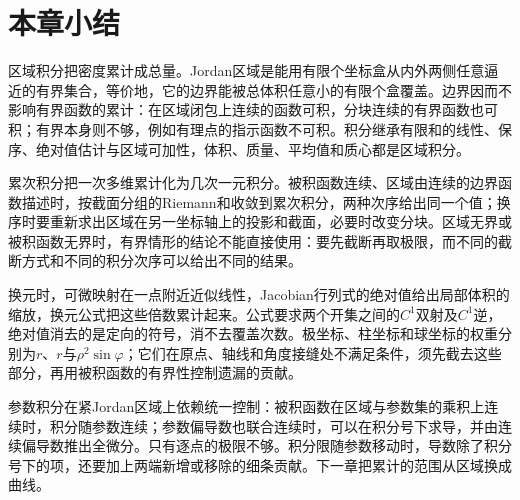 \FloatBarrier
\section{本章小结}
\label{sec:region-integrals-summary}

区域积分把密度累计成总量。Jordan区域是能用有限个坐标盒从内外两侧任意逼近的有界集合，等价地，它的边界能被总体积任意小的有限个盒覆盖。边界因而不影响有界函数的累计：在区域闭包上连续的函数可积，分块连续的有界函数也可积；有界本身则不够，例如有理点的指示函数不可积。积分继承有限和的线性、保序、绝对值估计与区域可加性，体积、质量、平均值和质心都是区域积分。

累次积分把一次多维累计化为几次一元积分。被积函数连续、区域由连续的边界函数描述时，按截面分组的Riemann和收敛到累次积分，两种次序给出同一个值；换序时要重新求出区域在另一坐标轴上的投影和截面，必要时改变分块。区域无界或被积函数无界时，有界情形的结论不能直接使用：要先截断再取极限，而不同的截断方式和不同的积分次序可以给出不同的结果。

换元时，可微映射在一点附近近似线性，Jacobian行列式的绝对值给出局部体积的缩放，换元公式把这些倍数累计起来。公式要求两个开集之间的$C^1$双射及$C^1$逆，绝对值消去的是定向的符号，消不去覆盖次数。极坐标、柱坐标和球坐标的权重分别为$r$、$r$与$\rho^2\sin\varphi$；它们在原点、轴线和角度接缝处不满足条件，须先截去这些部分，再用被积函数的有界性控制遗漏的贡献。

参数积分在紧Jordan区域上依赖统一控制：被积函数在区域与参数集的乘积上连续时，积分随参数连续；参数偏导数也联合连续时，可以在积分号下求导，并由连续偏导数推出全微分。只有逐点的极限不够。积分限随参数移动时，导数除了积分号下的项，还要加上两端新增或移除的细条贡献。下一章把累计的范围从区域换成曲线。
